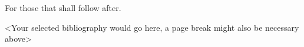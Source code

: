 \documentclass[letterpaper,10pt]{article} %
\begin{document}
\begin{dedication}
    For those that shall follow after.
\end{dedication}\newpage


\bodymatter     %












\backmatter     %


\cleardoublepage
\begin{selected-bibliography}
<Your selected bibliography would go here, a page break might also be necessary above>
\end{selected-bibliography}

\end{document}
